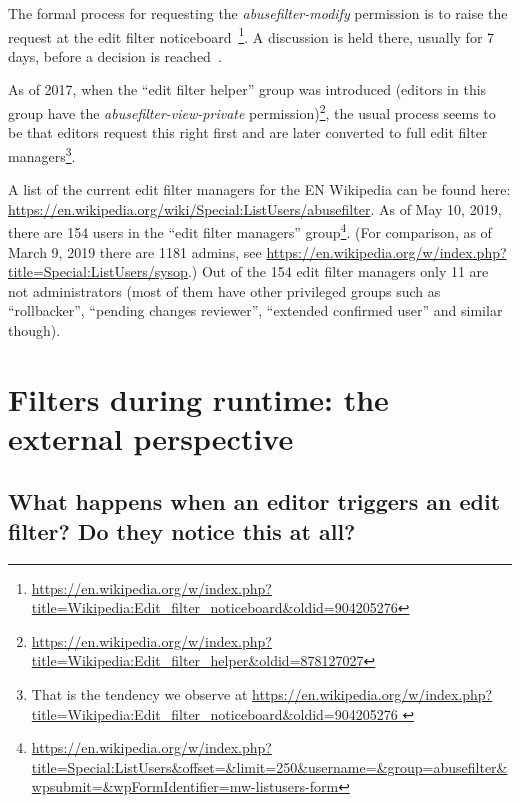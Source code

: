 The formal process for requesting the \emph{abusefilter-modify} permission is to raise the request at the edit filter noticeboard~\footnote{\url{https://en.wikipedia.org/w/index.php?title=Wikipedia:Edit_filter_noticeboard&oldid=904205276}}.
A discussion is held there, usually for 7 days, before a decision is reached~\cite{Wikipedia:EditFilter}.

As of 2017, when the ``edit filter helper'' group was introduced (editors in this group have the \emph{abusefilter-view-private} permission)\footnote{\url{https://en.wikipedia.org/w/index.php?title=Wikipedia:Edit_filter_helper&oldid=878127027}},
the usual process seems to be that editors request this right first and are later converted to full edit filter managers\footnote{That is the tendency we observe at \url{https://en.wikipedia.org/w/index.php?title=Wikipedia:Edit_filter_noticeboard&oldid=904205276 }}.

A list of the current edit filter managers for the EN Wikipedia can be found here: \url{https://en.wikipedia.org/wiki/Special:ListUsers/abusefilter}.
As of May 10, 2019, there are 154 users in the ``edit filter managers'' group\footnote{\url{https://en.wikipedia.org/w/index.php?title=Special:ListUsers&offset=&limit=250&username=&group=abusefilter&wpsubmit=&wpFormIdentifier=mw-listusers-form}}.
(For comparison, as of March 9, 2019 there are 1181 admins, see \url{https://en.wikipedia.org/w/index.php?title=Special:ListUsers/sysop}.)
Out of the 154 edit filter managers only 11 are not administrators (most of them have other privileged groups such as ``rollbacker'', ``pending changes reviewer'', ``extended confirmed user'' and similar though).



\section{Filters during runtime: the external perspective}


\subsection{What happens when an editor triggers an edit filter? Do they notice this at all?}

